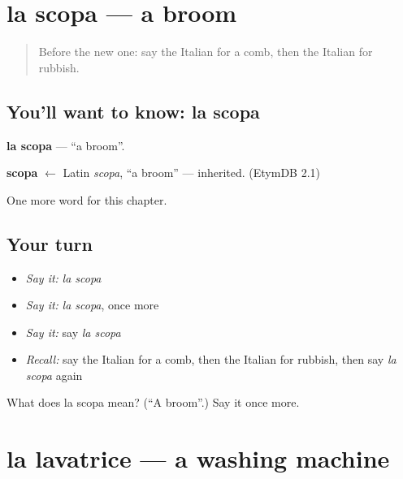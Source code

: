 \section[la scopa]{la scopa — a broom}

\label{lesson:IT-C97-scopa}



\begin{quote}
Before the new one: say the Italian for a comb, then the Italian for rubbish.
\end{quote}

\subsection*{You'll want to know: la scopa}
\textbf{la scopa} — \textquotedblleft{}a broom\textquotedblright{}.

\begin{cousinweb}
\textbf{scopa} $\leftarrow$ Latin \emph{scopa}, \textquotedblleft{}a broom\textquotedblright{} — inherited. (EtymDB 2.1)
\end{cousinweb}

\begin{grammarlens}[title={What you've built}]
One more word for this chapter.
\end{grammarlens}

\subsection*{Your turn}
\begin{itemize}
\raggedright
  \item \emph{Say it:} \emph{la scopa}
  \item \emph{Say it:} \emph{la scopa}, once more
  \item \emph{Say it:} say \emph{la scopa}
  \item \emph{Recall:} say the Italian for a comb, then the Italian for rubbish, then say \emph{la scopa} again
\end{itemize}

\begin{tcolorbox}[breakable,colback=teal!4,colframe=teal!35!black,title={Before you move on}]
What does la scopa mean? (\textquotedblleft{}A broom\textquotedblright{}.) Say it once more.
\end{tcolorbox}
\section[la lavatrice]{la lavatrice — a washing machine}

